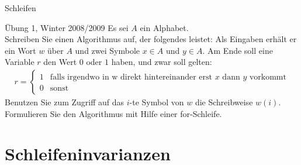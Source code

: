 \begin{frame}{Schleifen}
    \begin{exampleblock}{Übung 1, Winter 2008/2009}
        Es sei $A$ ein Alphabet.\\
        Schreiben Sie einen Algorithmus auf, der folgendes leistet: Als Eingaben erhält er ein Wort $w$ über $A$ und zwei Symbole $x \in A$ und $y \in A$. Am Ende soll eine Variable $r$ den Wert $0$ oder $1$ haben, und zwar soll gelten:\\
        \begin{align*}
            r = \begin{cases} 1 & \text{falls irgendwo in w direkt hintereinander erst $x$ dann $y$ vorkommt}\\ 0 &\text{sonst}\end{cases}
        \end{align*}
        Benutzen Sie zum Zugriff auf das $i$-te Symbol von $w$ die Schreibweise $w\left( i\right)$. Formulieren Sie den Algorithmus mit Hilfe einer for-Schleife.
    \end{exampleblock}
\end{frame}

\section{Schleifeninvarianzen}


